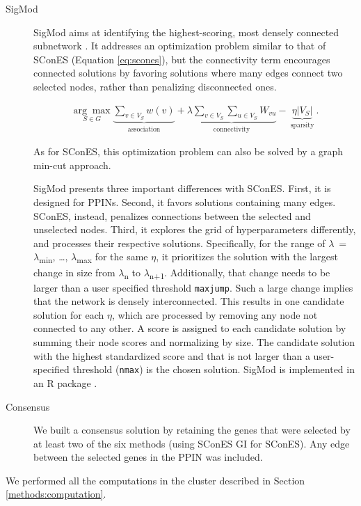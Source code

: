 \documentclass[10pt,letterpaper]{article}
\begin{document}
\begin{description}
\item[{SigMod}] SigMod aims at identifying the highest-scoring, most densely connected subnetwork \cite{liu_sigmod:_2017}. It addresses an optimization problem similar to that of SConES (Equation \ref{eq:scones}), but the connectivity term encourages connected solutions by favoring solutions where many edges connect two selected nodes, rather than penalizing disconnected ones.  

\begin{eqnarray}
\underset{S \in G}{\arg \max } \underbrace{\sum_{v \in V_S} w(v)}_{\text { association }} + \underbrace{\lambda \sum_{v \in V_S} \sum_{u \in V_S} W_{vu} }_{\text { connectivity }} -\underbrace{\eta \lvert V_S \rvert }_{\text { sparsity }}.
\end{eqnarray}

As for SConES, this optimization problem can also be solved by a graph min-cut approach. 

SigMod presents three important differences with SConES. First, it is designed for PPINs. Second, it favors solutions containing many edges. SConES, instead, penalizes connections between the selected and unselected nodes. Third, it explores the grid of hyperparameters differently, and processes their respective solutions. Specifically, for the range of \(\lambda\)~=~\(\lambda\)\textsubscript{min}, \dots{}, \(\lambda\)\textsubscript{max} for the same \(\eta\), it prioritizes the solution with the largest change in size from \(\lambda\)\textsubscript{n} to \(\lambda\)\textsubscript{n+1}. Additionally, that change needs to be larger than a user specified threshold \texttt{maxjump}. Such a large change implies that the network is densely interconnected. This results in one candidate solution for each \(\eta\), which are processed by removing any node not connected to any other. A score is assigned to each candidate solution by summing their node scores and normalizing by size. The candidate solution with the highest standardized score and that is not larger than a user-specified threshold (\texttt{nmax}) is the chosen solution. SigMod is implemented in an R package \cite{sigmod}.

\item[{Consensus}] We built a consensus solution by retaining the genes that were selected by at least two of the six methods (using SConES GI for SConES). Any edge between the selected genes in the PPIN was included.
\end{description}

We performed all the computations in the cluster described in Section \ref{methods:computation}. 
\end{document}
